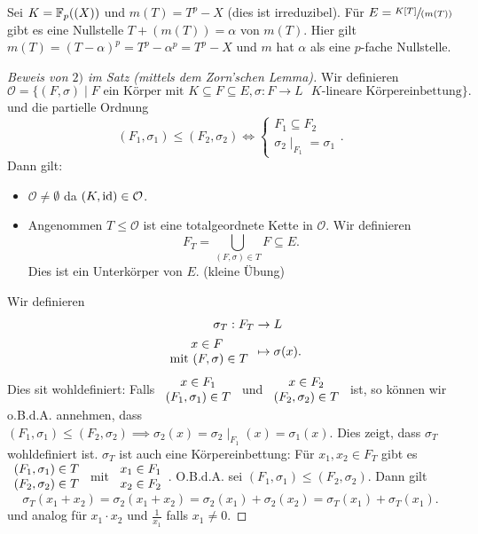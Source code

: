 \begin{eg}
	Sei $K = \mathbb{F}_{p}((X))$ und $m(T) = T^{p} - X$ (dies ist irreduzibel).
	Für $E = \sfrac{K[T]}{(m(T))}$ gibt es eine Nullstelle $T + (m(T)) = \alpha$ von $m(T)$.
	Hier gilt $m(T) = (T - \alpha)^{p} = T^{p} - \alpha^{p} = T^{p} - X$ und $m$ hat $\alpha$ als eine $p$-fache Nullstelle.
\end{eg}

\begin{proof}[Beweis von $2)$ im Satz (mittels dem Zorn'schen Lemma)]
	Wir definieren
	\[
		\mathcal{O} = \{(F,\sigma) \mid F \text{ ein Körper mit } K \subseteq F \subseteq E, \sigma: F \to  L \text{ $K$-lineare Körpereinbettung}\} 
	.\] 
	und die partielle Ordnung
	\[
		(F_1,\sigma_1) \leq (F_2,\sigma_2) \Leftrightarrow \begin{cases}
			F_1 \subseteq F_2\\
			\sigma_{2} \mid_{F_1} = \sigma_1
		\end{cases}
	.\]
	Dann gilt:
	\begin{itemize}
		\item $\mathcal{O} \neq \emptyset$ da $(K,\operatorname{id}) \in \mathcal{O}$.
		\item Angenommen $T \leq \mathcal{O}$ ist eine totalgeordnete Kette in $\mathcal{O}$. Wir definieren
			\[
				F_{T} = \bigcup_{(F,\sigma) \in T} F \subseteq E
			.\] 
			Dies ist ein Unterkörper von $E$. (kleine Übung)
	\end{itemize}
	Wir definieren
	\begin{align*}
		\sigma_{T}: F_{T} &\to L\\
		\begin{array}{c} x \in F\\ \text{ mit } (F,\sigma) \in T\\ \end{array} &\mapsto \sigma(x)
	.\end{align*}
	Dies sit wohldefiniert: Falls $\begin{array}{c} x \in F_1\\ (F_1,\sigma_1) \in T\\ \end{array}$ und $\begin{array}{c} x \in F_2\\ (F_2,\sigma_2) \in T\\ \end{array}$ ist, so können wir o.B.d.A. annehmen,
	dass $(F_1,\sigma_1) \leq (F_2,\sigma_2) \implies \sigma_2(x) = \sigma_2 \mid_{F_1} (x) = \sigma_1(x)$.
	Dies zeigt, dass $\sigma_{T}$ wohldefiniert ist.
	$\sigma_{T}$ ist auch eine Körpereinbettung:
	Für $x_1,x_2 \in F_{T}$ gibt es $\begin{array}{c} (F_1,\sigma_1) \in T\\ (F_2,\sigma_2) \in T\\ \end{array}$ mit $\begin{array}{c} x_1 \in F_1\\ x_2 \in F_2\\ \end{array}$.
	O.B.d.A. sei $(F_1,\sigma_1) \leq (F_2,\sigma_2)$. Dann gilt
	\[
		\sigma_{T}(x_1+x_2) = \sigma_2(x_1+x_2) = \sigma_2(x_1) + \sigma_2(x_2) = \sigma_{T}(x_1) + \sigma_{T}(x_1)
	.\] 
	und analog für $x_1 \cdot x_2$ und $\frac{1}{x_1}$ falls $x_1 \neq 0$.


\end{proof}
